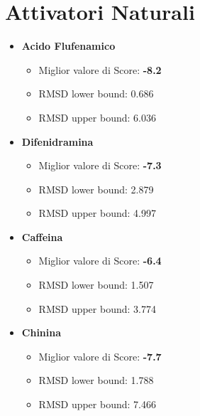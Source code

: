 \documentclass[12pt, a4paper]{book}
\begin{document}
\section*{Attivatori Naturali}
\begin{itemize}
    \item \textbf{Acido Flufenamico}
    \begin{itemize}
        \item Miglior valore di Score: \textbf{-8.2}
        \item RMSD lower bound: 0.686
        \item RMSD upper bound: 6.036
    \end{itemize}
    
    \item \textbf{Difenidramina}
    \begin{itemize}
        \item Miglior valore di Score: \textbf{-7.3}
        \item RMSD lower bound: 2.879
        \item RMSD upper bound: 4.997
    \end{itemize}
    
    \item \textbf{Caffeina}
    \begin{itemize}
        \item Miglior valore di Score: \textbf{-6.4}
        \item RMSD lower bound: 1.507
        \item RMSD upper bound: 3.774
    \end{itemize}
    
    \item \textbf{Chinina}
    \begin{itemize}
        \item Miglior valore di Score: \textbf{-7.7}
        \item RMSD lower bound: 1.788
        \item RMSD upper bound: 7.466
    \end{itemize}
\end{itemize}
\end{document}
